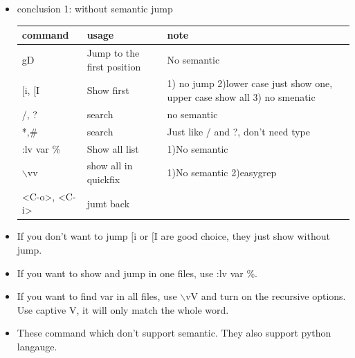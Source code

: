 \documentclass[paper=8.5in:11in, twoside, 12pt, pagesize=pdftex]{book}
\begin{document}
									\begin{itemize}
										\item conclusion 1: without semantic jump
										\begin{center}
											\begin{tabular}{p{0.33\textwidth}|p{0.33\textwidth}|p{}}
												\hline
												command & usage & note\\
												
												\hline 
												gD & Jump to the first position & No semantic  \\
												
												\hline 
												$[$i, $[$I & Show first & 1) no jump 2)lower case just show one, upper case show all  3) no smenatic\\
												
												\hline 
												/, ? & search & no semantic  \\
												
												\hline 
												*,\# & search & Just like / and ?, don't need type  \\
												
												\hline 
												:lv var \% & Show all list & 1)No semantic  \\
												
												\hline 
												$\backslash$vv & show all in quickfix & 1)No semantic 2)easygrep\\
												
												\hline
												<C-o>, <C-i> & jumt back &  \\
												
												
											\end{tabular}
										\end{center}
										
										\item If you don't want to jump $[$i or $[$I are good choice, they just show without jump.
										
										\item If you want to show and jump in one files, use :lv var \%. 
										
										\item If you want to find var in all files, use $\backslash$vV and turn on the recursive options. Use captive V, it will only match the whole word.
										
										\item These command which don't support semantic. They also support python langauge. 
										

\end{itemize}
\end{document}
